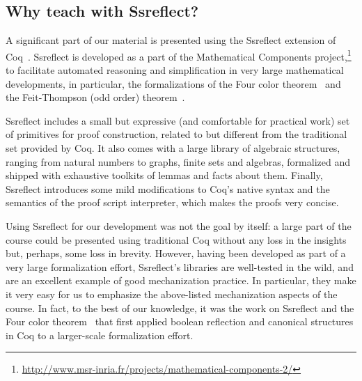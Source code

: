 \documentclass[blockstyle,preprint,nocopyrightspace]{sigplanconf}
\begin{document}
\vspace{5pt}

\subsection{Why teach with Ssreflect?}
\label{sec:why-ssreflect}

A significant part of our material is presented using the Ssreflect
extension of Coq~\cite{Gonthier-al:TR}. Ssreflect is developed as a
part of the Mathematical Components
project,\footnote{\scriptsize{\url{http://www.msr-inria.fr/projects/mathematical-components-2/}}}
to facilitate automated reasoning and simplification in very large
mathematical developments, in particular, the formalizations of the
Four color theorem~\cite{Gonthier:AMS08} and the Feit-Thompson (odd
order) theorem~\cite{Gonthier-al:ITP13}.

Ssreflect includes a small but expressive (and comfortable for
practical work) set of primitives for proof construction, related to
but different from the traditional set provided by Coq. It also comes
with a large library of algebraic structures, ranging from natural
numbers to graphs, finite sets and algebras, formalized and shipped
with exhaustive toolkits of lemmas and facts about them. Finally,
Ssreflect introduces some mild modifications to Coq's native syntax
and the semantics of the proof script interpreter, which makes the
proofs very concise.

Using Ssreflect for our development was not the goal by itself: a
large part of the course could be presented using traditional Coq
without any loss in the insights but, perhaps, some loss in brevity.
%
However, having been developed as part of a very large formalization
effort, Ssreflect's libraries are well-tested in the wild, and are an
excellent example of good mechanization practice. In particular, they
make it very easy for us to emphasize the above-listed mechanization
aspects of the course. In fact, to the best of our knowledge, it was
the work on Ssreflect and the Four color
theorem~\cite{Gonthier:AMS08,Garillot-al:TPHOL09,Garillot:PhD} that
first applied boolean reflection and canonical structures in Coq to a
larger-scale formalization effort.
\end{document}
